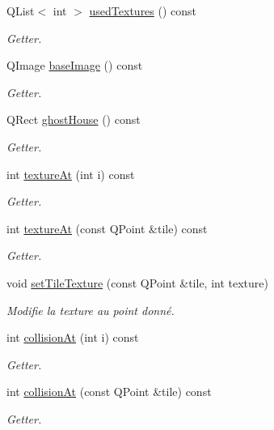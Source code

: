 \begin{DoxyCompactItemize}
Q\+List$<$ int $>$ \hyperlink{class_editor_level_a55d8b5bb811bd19ff03207aa5139cd29}{used\+Textures} () const 
\begin{DoxyCompactList}\small\item\em Getter. \end{DoxyCompactList}\item 
Q\+Image \hyperlink{class_editor_level_a11a8c1c65373fb434a5dcd10f6289ab6}{base\+Image} () const 
\begin{DoxyCompactList}\small\item\em Getter. \end{DoxyCompactList}\item 
Q\+Rect \hyperlink{class_editor_level_a59be959931be8add111ae0e71e29efde}{ghost\+House} () const 
\begin{DoxyCompactList}\small\item\em Getter. \end{DoxyCompactList}\item 
int \hyperlink{class_editor_level_ae3f053e341c76724d8c04f8af45ca628}{texture\+At} (int i) const 
\begin{DoxyCompactList}\small\item\em Getter. \end{DoxyCompactList}\item 
int \hyperlink{class_editor_level_a9e423202c7d444df59a94f232b764d3f}{texture\+At} (const Q\+Point \&tile) const 
\begin{DoxyCompactList}\small\item\em Getter. \end{DoxyCompactList}\item 
void \hyperlink{class_editor_level_a936bf5bbed34ea2b4348a9e536abe485}{set\+Tile\+Texture} (const Q\+Point \&tile, int texture)
\begin{DoxyCompactList}\small\item\em Modifie la texture au point donné. \end{DoxyCompactList}\item 
int \hyperlink{class_editor_level_ac4666cba00b23cbc18587d00074d1f43}{collision\+At} (int i) const 
\begin{DoxyCompactList}\small\item\em Getter. \end{DoxyCompactList}\item 
int \hyperlink{class_editor_level_a32fd50e0edbc1fbe718266de7346ff07}{collision\+At} (const Q\+Point \&tile) const 
\begin{DoxyCompactList}\small\item\em Getter. \end{DoxyCompactList}\item 

\end{DoxyCompactItemize}
